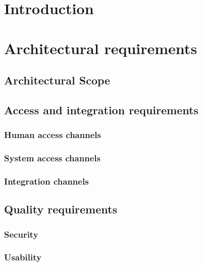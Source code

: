 \documentclass[a4paper,12pt,titlepage]{article}
\begin{document}


\tableofcontents
\newpage

\section{Introduction}

\section{Architectural requirements}
	\subsection{Architectural Scope} %
	
	\newpage
	
	\subsection{Access and integration requirements}
			\subsubsection{Human access channels}	
			\subsubsection{System access channels}	
			\subsubsection{Integration channels}
 	\subsection{Quality requirements}
 	
		\subsubsection{Security}
			
		\subsubsection{Usability}
			
\end{document}
